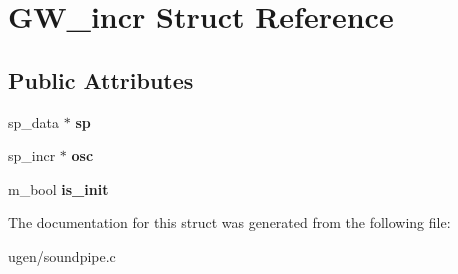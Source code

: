 \hypertarget{structGW__incr}{}\section{G\+W\+\_\+incr Struct Reference}
\label{structGW__incr}
\subsection*{Public Attributes}
\begin{DoxyCompactItemize}
\item 
\hypertarget{structGW__incr_ac237a9ce2bfb081d5def0f9b9312f4fc}{}\label{structGW__incr_ac237a9ce2bfb081d5def0f9b9312f4fc} 
sp\+\_\+data $\ast$ {\bfseries sp}
\item 
\hypertarget{structGW__incr_a3cd487b6b2288680d6e1557120ab77ed}{}\label{structGW__incr_a3cd487b6b2288680d6e1557120ab77ed} 
sp\+\_\+incr $\ast$ {\bfseries osc}
\item 
\hypertarget{structGW__incr_a93850a1c81e0653a41349076e5cb2703}{}\label{structGW__incr_a93850a1c81e0653a41349076e5cb2703} 
m\+\_\+bool {\bfseries is\+\_\+init}
\end{DoxyCompactItemize}


The documentation for this struct was generated from the following file\+:\begin{DoxyCompactItemize}
\item 
ugen/soundpipe.\+c\end{DoxyCompactItemize}
